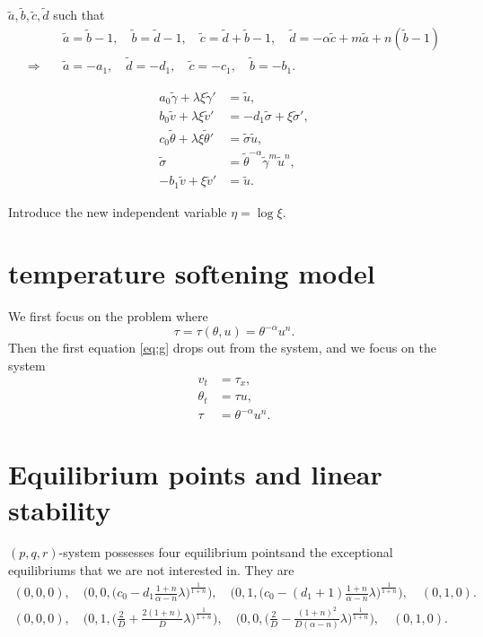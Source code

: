 \documentclass[a4paper,11pt]{article}
\def\tg{{\tilde{\gamma}}}
\def\tv{{\tilde{v}}}
\def\tth{{\tilde{\theta}}}
\def\ts{{\tilde{\sigma}}}
\def\tu{{\tilde{u}}}
\def\ta{{\tilde{a}}}
\def\tb{{\tilde{b}}}
\def\tc{{\tilde{c}}}
\def\td{{\tilde{d}}}
\begin{document}
$\ta, \tb, \tc, \td$ such that
\begin{align*}
 &\ta=\tb-1, \quad \tb=\td-1, \quad \tc=\td+\tb-1,\quad \td = -\alpha \tc + m\ta +n(\tb-1) \\
 \Longrightarrow \quad&\ta = -a_1, \quad \td = -d_1, \quad \tc = -c_1, \quad \tb=-b_1.
\end{align*}

\begin{equation} \label{eq:tildesys}
 \begin{aligned}
  a_0\tg + \lambda\xi\tg' &=\tu,\\
  b_0\tv + \lambda\xi\tv' &=-d_1 \ts + \xi\ts',\\
  c_0\tth+ \lambda\xi\tth'&=\ts\tu,\\
  \ts &=\tth^{-\alpha}\tg^m\tu^n,\\
  -b_1\tv+\xi\tv' &= \tu.
 \end{aligned}
\end{equation}

Introduce the new independent variable $\eta = \log\xi$.

\section{temperature softening model}
We first focus on the problem where
$$ \tau = \tau(\theta,u) = \theta^{-\alpha}u^n.$$
Then the first equation \eqref{eq:g} drops out from the system, and we focus on the system
\begin{equation} \label{eq:orisys}
 \begin{aligned}
  v_t &= \tau_x,\\
  \theta_t &= \tau u,\\
  \tau &=\theta^{-\alpha}u^n.
 \end{aligned}
\end{equation}




\section{Equilibrium points and linear stability}
$(p,q,r)$-system possesses four equilibrium points\footnotemark[1] and the exceptional equilibriums that we are not interested in. They are
\begin{align*}
  (0,0,0), \quad \Big(0,0,\big(c_0-d_1\frac{1+n}{\alpha-n}\lambda\big)^{\frac{1}{1+n}}\Big), \quad \Big(0,1,\big(c_0-(d_1+1)\frac{1+n}{\alpha-n}\lambda\big)^{\frac{1}{1+n}}\Big), \quad (0,1,0).\\
 (0,0,0), \quad \Big(0,1,\big(\frac{2}{D} + \frac{2(1+n)}{D} \lambda\big)^{\frac{1}{1+n}}\Big), \quad \Big(0,0,\big(\frac{2}{D} -\frac{(1+n)^2}{D(\alpha-n)} \lambda\big)^{\frac{1}{1+n}}\Big), \quad (0,1,0).
\end{align*}
\end{document}
